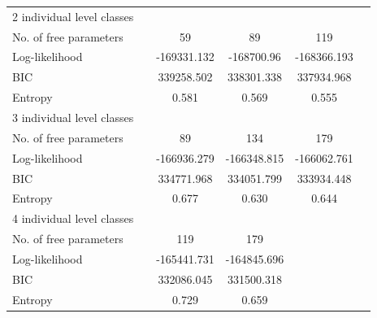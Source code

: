 \begin{table}[H]
\begin{tabular}[t]{lccccc}
		\hspace{1em}2 individual level classes &  &  &  &  & \\
		\hspace{1em}\hspace{1em}No. of free parameters &  & 59 & 89 & 119 & \\
		\hspace{1em}\hspace{1em}Log-likelihood &  & -169331.132 & -168700.96 & -168366.193 & \\
		\hspace{1em}\hspace{1em}BIC &  & 339258.502 & 338301.338 & 337934.968 & \\
		\hspace{1em}\hspace{1em}Entropy &  & 0.581 & 0.569 & 0.555 & \\
		\hspace{1em}3 individual level classes &  &  &  &  & \\
		\hspace{1em}\hspace{1em}No. of free parameters &  & 89 & 134 & 179 & \\
		\hspace{1em}\hspace{1em}Log-likelihood &  & -166936.279 & -166348.815 & -166062.761 & \\
		\hspace{1em}\hspace{1em}BIC &  & 334771.968 & 334051.799 & 333934.448 & \\
		\hspace{1em}\hspace{1em}Entropy &  & 0.677 & 0.630 & 0.644 & \\
		\hspace{1em}4 individual level classes &  &  &  &  & \\
		\hspace{1em}\hspace{1em}No. of free parameters &  & 119 & 179 &  & \\
		\hspace{1em}\hspace{1em}Log-likelihood &  & -165441.731 & -164845.696 &  & \\
		\hspace{1em}\hspace{1em}BIC &  & 332086.045 & 331500.318 &  & \\
		\hspace{1em}\hspace{1em}Entropy &  & 0.729 & 0.659 &  & \\

\end{tabular}
\end{table}
